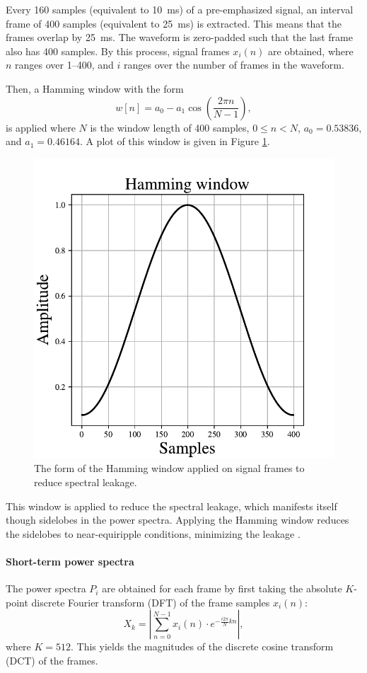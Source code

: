 			Every 160 samples (equivalent to \SI{10}{ms}) of a pre-emphasized signal, an interval frame of 400 samples (equivalent to \SI{25}{ms}) is extracted.
			This means that the frames overlap by \SI{25}{ms}.
			The waveform is zero-padded such that the last frame also has 400 samples.
			By this process, signal frames $x_i(n)$ are obtained, where $n$ ranges over 1--400, and $i$ ranges over the number of frames in the waveform.

			Then, a Hamming window with the form
			\begin{equation}\label{eq:hamming}
				w\left[n\right] = a_0 - a_1\cos\left(\frac{2\pi n}{N-1}\right),
			\end{equation}
			is applied where $N$ is the window length of 400 samples, $0 \leq n < N$, $a_0 = 0.53836$, and $a_1 = 0.46164$.
			A plot of this window is given in Figure \ref{fig:hamming}.
			\begin{figure}[ht]
				\centering
			    \includegraphics[width=0.45\linewidth]{gfx/hamming}
			    \caption[Hamming window]{The form of the Hamming window applied on signal frames to reduce spectral leakage.}
			    \label{fig:hamming}
			\end{figure}
			This window is applied to reduce the spectral leakage, which manifests itself though sidelobes in the power spectra.
			Applying the Hamming window reduces the sidelobes to near-equiripple conditions, minimizing the leakage \citep{SASPWEB2011}.

		\paragraph{Short-term power spectra}

			The power spectra $P_i$ are obtained for each frame by first taking the absolute $K$-point discrete Fourier transform (DFT) of the frame samples $x_i(n)$:
			\begin{equation}
				X_k = \left|\sum_{n=0}^{N-1}x_i(n)\cdot e^{-\frac{i2\pi}{N}kn}\right|,
			\end{equation}
			where $K=512$.
			This yields the magnitudes of the discrete cosine transform (DCT) of the frames.

